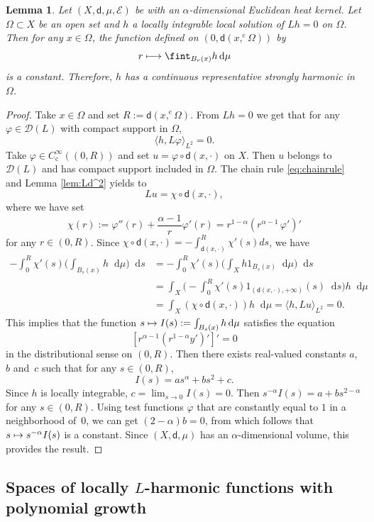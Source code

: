 \documentclass[10pt]{amsart}
\newcommand\mto{\mathchoice{\longmapsto}{\mapsto}{\mapsto}{\mapsto}}
\newcommand{\rmc}{\mathrm{c}}
\theoremstyle{plain}
\newtheorem{lemma}[theorem]{Lemma}
\theoremstyle{definition}
\newcommand{\cE}{\mathcal{E}}
\newcommand{\cD}{\mathcal{D}}
\let\phi\varphi
\newcommand{\di}{\mathop{}\!\mathrm{d}}
\newcommand{\dist}{\mathsf{d}}
\begin{document}
\begin{lemma}\label{lem:Lstrong} Let $(X,\dist,\mu,\cE)$ be with an $\alpha$-dimensional Euclidean heat kernel. Let $\Omega \subset X$ be an open set and $h$ a locally integrable local solution of $Lh=0$ on $\Omega$. Then for any $x \in \Omega$, the function defined on $(0,\dist(x,^\rmc\!\Omega))$ by
\[
r\mto \fint_{B_r(x)}h \di \mu
\]
is a constant. Therefore, $h$ has a continuous representative strongly harmonic in $\Omega$.
\end{lemma}
\begin{proof}
Take $x \in \Omega$ and set $R:=\dist(x,^\rmc\!\Omega)$. From $Lh=0$ we get that for any $\phi \in \cD(L)$ with compact support in $\Omega$,
\[
\langle h,L\phi\rangle_{L^2}=0.
\]
Take $\phi \in C_\rmc^\infty((0,R))$ and set
$u=\phi \circ \dist(x,\cdot)$ on $X$. Then $u$ belongs to $\cD(L)$ and has compact support included in $\Omega$. The chain rule \eqref{eq:chainrule} and Lemma \ref{lem:Ld^2} yields to
\[
Lu = \chi\circ \dist(x,\cdot),
\]
where we have set
\[
\chi(r):= \phi''(r) + \frac{\alpha - 1}{r} \phi'(r) = r^{1-\alpha} \left(r^{\alpha-1}\, \phi'\right)'
\]
for any $r \in (0,R)$. Since $\chi \circ \dist(x,\cdot)=-\int_{\dist(x,\cdot)}^R \chi'(s)ds$, we have
\begin{align*}
-\int_0^R \chi'(s)\biggl(\int_{B_s(x)}h\di\mu\biggr)\di s & = -\int_0^R \chi'(s)\biggl(\int_X h1_{B_s(x)}\di\mu\biggr)\di s\\
& = \int_X \biggl(- \int_0^R \chi'(s) 1_{(\dist(x,\cdot),+\infty)}(s) \di s \biggr) h \di \mu\\
& = \int_X (\chi \circ \dist(x,\cdot)) h \di \mu = \langle h,Lu\rangle_{L^2} = 0.
\end{align*}
This implies that the function
$s\mto I(s):= \int_{B_s(x)}h\di \mu$ satisfies the equation
\[
\left[r^{\alpha-1}\left(r^{1-\alpha}y'\right)'\right]'=0
\]
in the distributional sense on $(0,R)$. Then there exists real-valued constants $a$, $b$ and~$c$ such that for any $s \in (0,R)$,
\[
I(s)=as^\alpha+bs^2+c.
\]
Since $h$ is locally integrable, $c=\lim_{s\to 0} I(s) = 0$. Then $s^{-\alpha}I(s)= a+b s^{2-\alpha}$ for any $s \in (0,R)$. Using test functions $\phi$ that are constantly equal to $1$ in a neighborhood of~$0$, we can get
$(2-\alpha)b=0$, from which follows that $s \mto s^{-\alpha} I(s)$ is a constant. Since $(X,\dist,\mu)$ has an $\alpha$-dimensional volume, this provides the result.
\end{proof}

\subsection{Spaces of locally $L$-harmonic functions with polynomial growth}
\end{document}
